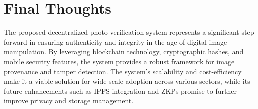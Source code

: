 \section{Final Thoughts}
The proposed decentralized photo verification system represents a significant step forward in ensuring authenticity and integrity in the age of digital image manipulation. 
By leveraging blockchain technology, cryptographic hashes, and mobile security features, the system provides a robust framework for image provenance and tamper detection. The system's scalability and cost-efficiency make it a viable solution for wide-scale adoption across various sectors, while its future enhancements such as IPFS integration and ZKPs promise to further improve privacy and storage management.